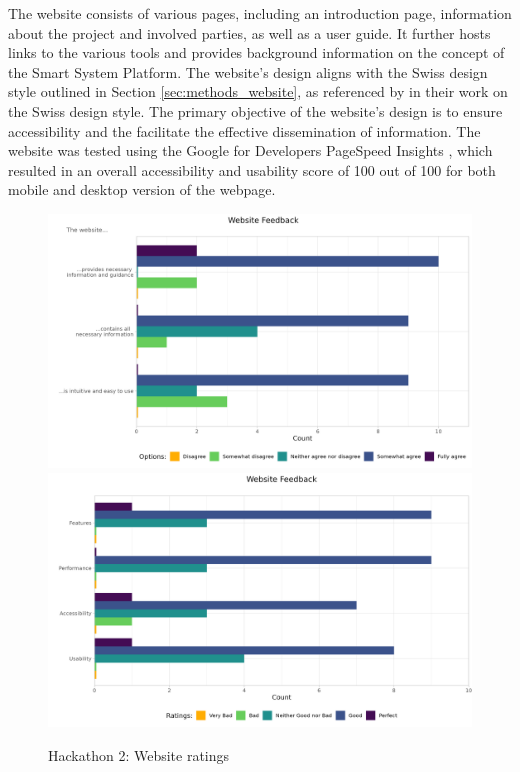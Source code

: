 The website consists of various pages, including an introduction page, information about the project and involved parties, as well as a user guide. It further hosts links to the various tools and provides background information on the concept of the Smart System Platform. The website's design aligns with the Swiss design style outlined in Section \ref{sec:methods_website}, as referenced by \citet{muller-brockmann_grid_2020, hollis_swiss_2006} in their work on the Swiss design style. The primary objective of the website's design is to ensure accessibility and the facilitate the effective dissemination of information. The website was tested using the Google for Developers PageSpeed Insights \citep{noauthor_pagespeed_nodate}, which resulted in an overall accessibility and usability score of 100 out of 100 for both mobile and desktop version of the webpage.

\begin{figure}[H]
    \centering
    \includegraphics[width=.80\linewidth]{rstudio/survey/plots/website2.png}\\
    \vspace{\ftspace}
    \includegraphics[width=.80\linewidth]{rstudio/survey/plots/website.png}
    \vspace{\ftspace}
    \caption{Hackathon 2: Website ratings}
    \label{fig:website_questions}
\end{figure}

